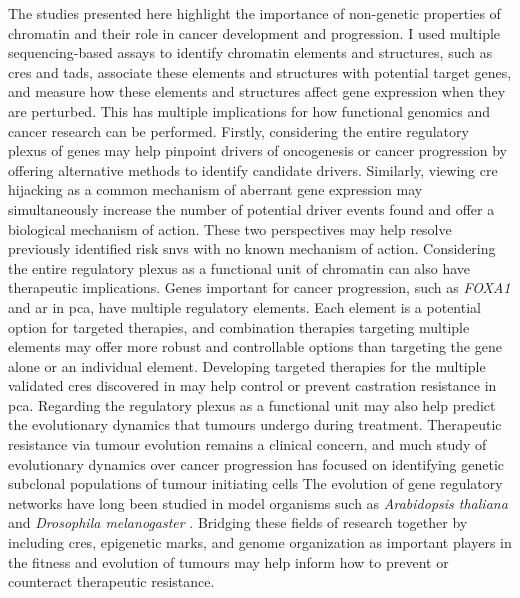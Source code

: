 The studies presented here highlight the importance of non-genetic properties of chromatin and their role in cancer development and progression.
I used multiple sequencing-based assays to identify chromatin elements and structures, such as \glspl{cre} and \glspl{tad}, associate these elements and structures with potential target genes, and measure how these elements and structures affect gene expression when they are perturbed.
This has multiple implications for how functional genomics and cancer research can be performed.
Firstly, considering the entire regulatory plexus of genes may help pinpoint drivers of oncogenesis or cancer progression by offering alternative methods to identify candidate drivers.
Similarly, viewing \gls{cre} hijacking as a common mechanism of aberrant gene expression may simultaneously increase the number of potential driver events found and offer a biological mechanism of action.
These two perspectives may help resolve previously identified risk \glspl{snv} with no known mechanism of action.
Considering the entire regulatory plexus as a functional unit of chromatin can also have therapeutic implications.
Genes important for cancer progression, such as \emph{FOXA1} and \gls{ar} in \gls{pca}, have multiple regulatory elements.
Each element is a potential option for targeted therapies, and combination therapies targeting multiple elements may offer more robust and controllable options than targeting the gene alone or an individual element.
Developing targeted therapies for the multiple validated \glspl{cre} discovered in  may help control or prevent castration resistance in \gls{pca}.
Regarding the regulatory plexus as a functional unit may also help predict the evolutionary dynamics that tumours undergo during treatment.
Therapeutic resistance via tumour evolution remains a clinical concern, and much study of evolutionary dynamics over cancer progression has focused on identifying genetic subclonal populations of tumour initiating cells \cite{pogrebniakHarnessingTumorEvolution2018,maleyClassifyingEvolutionaryEcological2017}
The evolution of gene regulatory networks have long been studied in model organisms such as \emph{Arabidopsis thaliana} \cite{nowickLineagespecificTranscriptionFactors2010} and \emph{Drosophila melanogaster} \cite{peterEvolutionGeneRegulatory2011}.
Bridging these fields of research together by including \glspl{cre}, epigenetic marks, and genome organization as important players in the fitness and evolution of tumours may help inform how to prevent or counteract therapeutic resistance.

